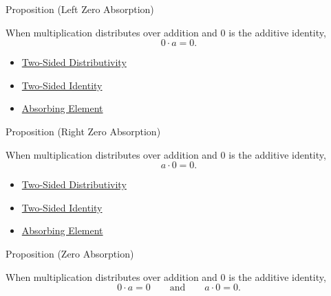 \begin{propositionbox}{Proposition (Left Zero Absorption)}
\begin{proposition}
\label{prop:left-zero-absorption}
When multiplication distributes over addition and $0$ is the additive identity,
\[
0\cdot a=0.
\]
\end{proposition}
\end{propositionbox}

\begin{dependencies}
\begin{itemize}
  \item \hyperref[def:two-sided-distributivity]{Two-Sided Distributivity}
  \item \hyperref[def:two-sided-identity]{Two-Sided Identity}
  \item \hyperref[def:absorbing-element]{Absorbing Element}
\end{itemize}
\end{dependencies}

\begin{propositionbox}{Proposition (Right Zero Absorption)}
\begin{proposition}
\label{prop:right-zero-absorption}
When multiplication distributes over addition and $0$ is the additive identity,
\[
a\cdot 0=0.
\]
\end{proposition}
\end{propositionbox}

\begin{dependencies}
\begin{itemize}
  \item \hyperref[def:two-sided-distributivity]{Two-Sided Distributivity}
  \item \hyperref[def:two-sided-identity]{Two-Sided Identity}
  \item \hyperref[def:absorbing-element]{Absorbing Element}
\end{itemize}
\end{dependencies}

\begin{propositionbox}{Proposition (Zero Absorption)}
\begin{proposition}
\label{prop:zero-absorption}
When multiplication distributes over addition and $0$ is the additive identity,
\[
0\cdot a=0
\qquad\text{and}\qquad
a\cdot 0=0.
\]
\end{proposition}
\end{propositionbox}

